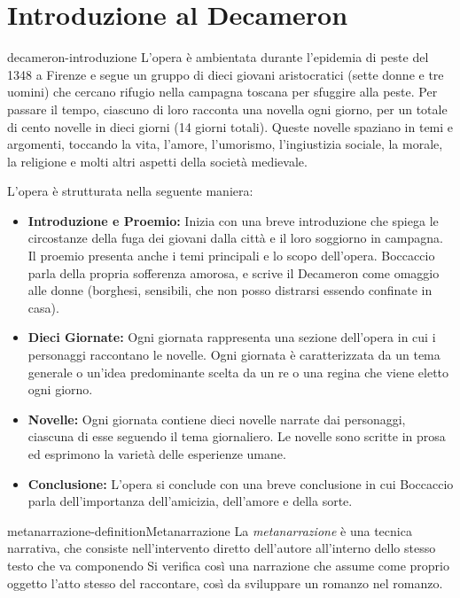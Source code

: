 \documentclass[preview]{standalone}
\begin{document}
\genpage

\section{Introduzione al Decameron}

\begin{snippet}{decameron-introduzione}
    L'opera è ambientata durante l'epidemia di peste del 1348 a Firenze
    e segue un gruppo di dieci giovani aristocratici (sette donne e tre uomini)
    che cercano rifugio nella campagna toscana per sfuggire alla peste.
    Per passare il tempo, ciascuno di loro racconta una novella ogni giorno,
    per un totale di cento novelle in dieci giorni (14 giorni totali).
    Queste novelle spaziano in temi e argomenti, toccando la vita, l'amore, l'umorismo,
    l'ingiustizia sociale, la morale, la religione e molti altri aspetti della società medievale.
    
    L'opera è strutturata nella seguente maniera:
    \begin{itemize}
        \item \textbf{Introduzione e Proemio:} Inizia con una breve introduzione che spiega le circostanze della fuga dei giovani dalla città e il loro soggiorno in campagna. Il proemio presenta anche i temi principali e lo scopo dell'opera.
            Boccaccio parla della propria sofferenza amorosa, e scrive il Decameron come omaggio alle donne (borghesi, sensibili, che non posso distrarsi essendo confinate in casa).
        \item \textbf{Dieci Giornate:} Ogni giornata rappresenta una sezione dell'opera in cui i personaggi raccontano le novelle. Ogni giornata è caratterizzata da un tema generale o un'idea predominante scelta da un re o una regina che viene eletto ogni giorno.
        \item \textbf{Novelle:} Ogni giornata contiene dieci novelle narrate dai personaggi, ciascuna di esse seguendo il tema giornaliero. Le novelle sono scritte in prosa ed esprimono la varietà delle esperienze umane.
        \item \textbf{Conclusione:} L'opera si conclude con una breve conclusione in cui Boccaccio parla dell'importanza dell'amicizia, dell'amore e della sorte.
    \end{itemize}
\end{snippet}

\begin{snippetdefinition}{metanarrazione-definition}{Metanarrazione}
    La \textit{metanarrazione} è una tecnica narrativa,
    che consiste nell'intervento diretto dell'autore all'interno dello stesso testo che va componendo
    Si verifica così una narrazione che assume come proprio oggetto l'atto stesso del raccontare,
    così da sviluppare un romanzo nel romanzo.
\end{snippetdefinition}
\end{document}
